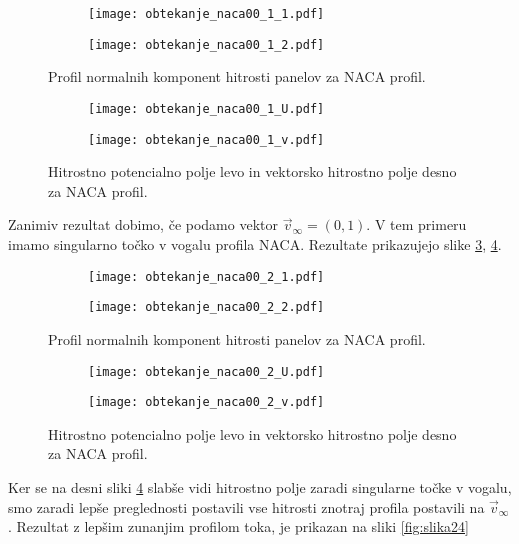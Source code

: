 \documentclass[12pt,a4paper]{article}
\begin{document}
\begin{figure}[H]
    \centering
    \begin{subfigure}[b]{0.45\textwidth}  			
        \texttt{[image: obtekanje\_naca00\_1\_1.pdf]}
    \end{subfigure}
    \begin{subfigure}[b]{0.45\textwidth}  			
        \texttt{[image: obtekanje\_naca00\_1\_2.pdf]}
    \end{subfigure}
    \caption{Profil normalnih komponent hitrosti panelov za NACA profil.} \label{fig:slika20}
\end{figure}

\begin{figure}[H]
    \centering
    \begin{subfigure}[b]{0.45\textwidth}  			
        \texttt{[image: obtekanje\_naca00\_1\_U.pdf]}
    \end{subfigure}
    \begin{subfigure}[b]{0.45\textwidth}  			
        \texttt{[image: obtekanje\_naca00\_1\_v.pdf]}
    \end{subfigure}
    \caption{Hitrostno potencialno polje levo in vektorsko hitrostno polje desno za NACA profil.} \label{fig:slika21}
\end{figure}

\noindent Zanimiv rezultat dobimo, če podamo vektor $\vec{v}_{\infty}=(0,1)$. V tem primeru imamo singularno točko v vogalu profila NACA. Rezultate prikazujejo slike \ref{fig:slika22}, \ref{fig:slika23}.

\begin{figure}[H]
    \centering
    \begin{subfigure}[b]{0.45\textwidth}  			
        \texttt{[image: obtekanje\_naca00\_2\_1.pdf]}
    \end{subfigure}
    \begin{subfigure}[b]{0.45\textwidth}  			
        \texttt{[image: obtekanje\_naca00\_2\_2.pdf]}
    \end{subfigure}
    \caption{Profil normalnih komponent hitrosti panelov za NACA profil.} \label{fig:slika22}
\end{figure}

\begin{figure}[H]
    \centering
    \begin{subfigure}[b]{0.45\textwidth}  			
        \texttt{[image: obtekanje\_naca00\_2\_U.pdf]}
    \end{subfigure}
    \begin{subfigure}[b]{0.45\textwidth}  			
        \texttt{[image: obtekanje\_naca00\_2\_v.pdf]}
    \end{subfigure}
    \caption{Hitrostno potencialno polje levo in vektorsko hitrostno polje desno za NACA profil.} \label{fig:slika23}
\end{figure}
\noindent Ker se na desni sliki \ref{fig:slika23} slabše vidi hitrostno polje zaradi singularne točke v vogalu, smo zaradi lepše preglednosti postavili vse hitrosti znotraj profila postavili na $\vec{v}_{\infty}$. Rezultat z lepšim zunanjim profilom toka, je prikazan na sliki \ref{fig:slika24}
\end{document}
